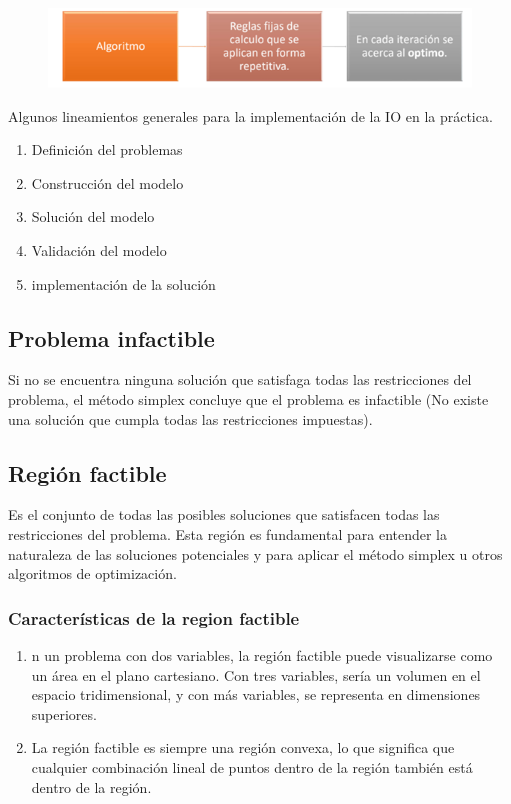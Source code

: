 \documentclass[conference]{IEEEtran}
\begin{document}
\begin{figure}[H]
    \begin{center}
        \includegraphics[width=\linewidth]{./Images/ProgramacionLineal.png}
        \caption{}
    \end{center}
\end{figure}

Algunos lineamientos generales para la implementación de la IO en la práctica.

\begin{enumerate}
    \item Definición del problemas
    \item Construcción del modelo
    \item Solución del modelo
    \item Validación del modelo
    \item implementación de la solución
\end{enumerate}

\subsection{Problema infactible}

Si no se encuentra ninguna solución que satisfaga todas las
restricciones del problema, el método simplex concluye que el problema
es infactible (No existe una solución que cumpla todas las
restricciones impuestas).

\subsection{Región factible}

Es el conjunto de todas las posibles soluciones que satisfacen todas las
restricciones del problema. Esta región es fundamental para entender la
naturaleza de las soluciones potenciales y para aplicar el método simplex
u otros algoritmos de optimización.

\subsubsection*{Características de la region factible}

\begin{enumerate}
    \item n un problema con dos variables, la región factible puede
          visualizarse como un área en el plano cartesiano. Con tres variables,
          sería un volumen en el espacio tridimensional, y con más variables, se
          representa en dimensiones superiores.

    \item La región factible es siempre una región convexa, lo que significa
          que cualquier combinación lineal de puntos dentro de la región también
          está dentro de la región.
\end{enumerate}
\end{document}
